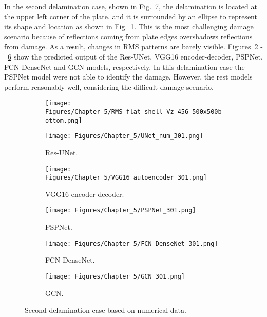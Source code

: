In the second delamination case, shown in Fig.~\ref{fig:rms_second_case}, the delamination is located at the upper left corner of the plate, and it is surrounded by an ellipse to represent its shape and location as shown in Fig.~\ref{fig:RMS_bottom_456}.
This is the most challenging damage scenario because of reflections coming from plate edges overshadows reflections from damage.
As a result, changes in RMS patterns are barely visible.
Figures~\ref{fig:unet_301} -~\ref{fig:gcn_301} show the predicted output of the Res-UNet, VGG16 encoder-decoder, PSPNet, FCN-DenseNet and GCN models, respectively. 
In this delamination case the PSPNet model were not able to identify the damage.
However, the rest models perform reasonably well, considering the difficult damage scenario.
\begin{figure} [!h]
	\centering
	\begin{subfigure}[b]{.48\textwidth}
		\centering
		\texttt{[image: Figures/Chapter\_5/RMS\_flat\_shell\_Vz\_456\_500x500bottom.png]}
		\caption{}
		\label{fig:RMS_bottom_456}
	\end{subfigure}
	\hfill
	\begin{subfigure}[b]{.48\textwidth}
		\centering
		\texttt{[image: Figures/Chapter\_5/UNet\_num\_301.png]}
		\caption{Res-UNet.}
		\label{fig:unet_301}	
	\end{subfigure}
	\hfill
	\begin{subfigure}[b]{.48\textwidth}
		\centering
		\texttt{[image: Figures/Chapter\_5/VGG16\_autoencoder\_301.png]}
		\caption{VGG16 encoder-decoder.}
		\label{fig:vgg16_301}
	\end{subfigure}
	\hfill
	\begin{subfigure}[b]{.48\textwidth}
		\centering
		\texttt{[image: Figures/Chapter\_5/PSPNet\_301.png]}
		\caption{PSPNet.}
		\label{fig:pspnet_301}	
	\end{subfigure}
	\hfill
	\begin{subfigure}[b]{.48\textwidth}
		\centering
		\texttt{[image: Figures/Chapter\_5/FCN\_DenseNet\_301.png]}
		\caption{FCN-DenseNet.}
		\label{fig:densenet_301}
	\end{subfigure}
	\hfill
	\begin{subfigure}[b]{.48\textwidth}
		\centering
		\texttt{[image: Figures/Chapter\_5/GCN\_301.png]}
		\caption{GCN.}
		\label{fig:gcn_301}	
	\end{subfigure}
	\caption{Second delamination case based on numerical data.}
	\label{fig:rms_second_case}
\end{figure}

